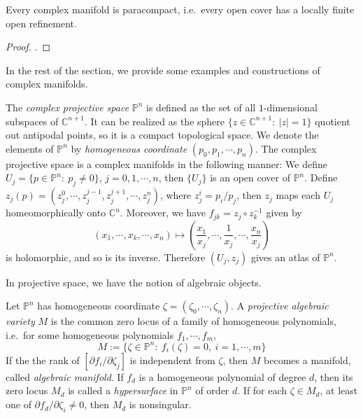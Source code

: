 \begin{lem}
    Every complex manifold is paracompact, i.e.\ every open cover has a locally finite open refinement.
\end{lem}
\begin{proof}
    \cite[Theorem~4.77]{LeeTop}.
\end{proof}

In the rest of the section, we provide some examples and constructions of complex manifolds.

\begin{cons}
    The \emph{complex projective space} $\mathbb{P}^n$ is defined as the set of all $1$-dimensional subspaces of $\mathbb{C}^{n+1}$.
    It can be realized as the sphere $\{z\in\mathbb{C}^{n+1}:\ |z|=1\}$ quotient out antipodal points, so it is a compact topological space.
    We denote the elements of $\mathbb{P}^n$ by \emph{homogeneous coordinate} $(p_0,p_1,\cdots,p_n)$.
    The complex projective space is a complex manifolds in the following manner:
    We define $U_j=\{p\in\mathbb{P}^n:\ p_j\neq 0\}$, $j=0,1,\cdots,n$, then $\{U_j\}$ is an open cover of $\mathbb{P}^n$.
    Define $z_j(p)=(z_j^0,\cdots,z_j^{j-1},z_j^{j+1},\cdots,z_j^n)$, where $z_j^i=p_i/p_j$, then $z_j$ maps each $U_j$ homeomorphically onto $\mathbb{C}^n$.
    Moreover, we have $f_{jk}=z_j\circ z_k^{-1}$ given by
    \[(x_1,\cdots,x_k,\cdots,x_n)\mapsto\left(\frac{x_1}{x_j},\cdots,\frac{1}{x_j},\cdots,\frac{x_n}{x_j}\right)\]
    is holomorphic, and so is its inverse.
    Therefore $(U_j,z_j)$ gives an atlas of $\mathbb{P}^n$.
\end{cons}

In projective space, we have the notion of algebraic objects.

\begin{defn}
    Let $\mathbb{P}^n$ has homogeneous coordinate $\zeta=(\zeta_0,\cdots,\zeta_n)$.
    A \emph{projective algebraic variety} $M$ is the common zero locus of a family of homogeneous polynomials, i.e.\ for some homogeneous polynomials $f_1,\cdots,f_m$, 
    \[M:=\{\zeta\in\mathbb{P}^n:\ f_i(\zeta)=0,\ i=1,\cdots,m\}\]
    If the the rank of $[\partial{f_i}/\partial{\zeta_j}]$ is independent from $\zeta$, then $M$ becomes a manifold, called \emph{algebraic manifold}.
    If $f_d$ is a homogeneous polynomial of degree $d$, then its zero locus $M_d$ is called a \emph{hypersurface} in $\mathbb{P}^n$ of order $d$.
    If for each $\zeta\in M_d$, at least one of $\partial f_d/\partial\zeta_i\neq 0$, then $M_d$ is nonsingular.
\end{defn}

